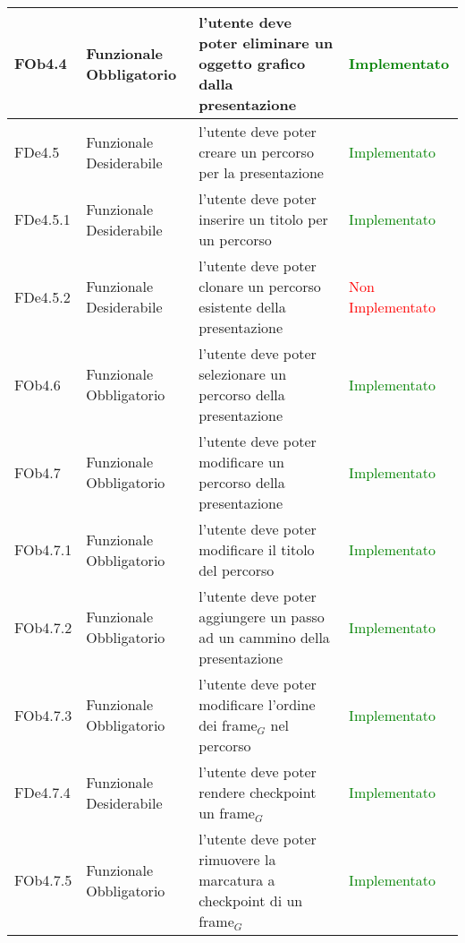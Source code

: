 \begin{longtable}{|l|p{2.5cm}|p{5cm}|p{3.5cm}|}
\hline
FOb4.4 & Funzionale \linebreak Obbligatorio & l'utente deve poter eliminare un oggetto grafico dalla presentazione & \textcolor{green}{Implementato}  \\
\hline
FDe4.5 & Funzionale \linebreak Desiderabile & l'utente deve poter creare un percorso per la presentazione & \textcolor{green}{Implementato}  \\
\hline
FDe4.5.1 & Funzionale \linebreak Desiderabile & l'utente deve poter inserire un titolo per un percorso & \textcolor{green}{Implementato}  \\
\hline
FDe4.5.2 & Funzionale \linebreak Desiderabile & l'utente deve poter clonare un percorso esistente della presentazione & \textcolor{red}{Non Implementato}  \\
\hline
FOb4.6 & Funzionale \linebreak Obbligatorio & l'utente deve poter selezionare un percorso della presentazione & \textcolor{green}{Implementato}  \\
\hline
FOb4.7 & Funzionale \linebreak Obbligatorio & l'utente deve poter modificare un percorso della presentazione & \textcolor{green}{Implementato}  \\
\hline
FOb4.7.1 & Funzionale \linebreak Obbligatorio & l'utente deve poter modificare il titolo del percorso & \textcolor{green}{Implementato}  \\
\hline
FOb4.7.2 & Funzionale \linebreak Obbligatorio & l'utente deve poter aggiungere un passo ad un cammino della presentazione & \textcolor{green}{Implementato}  \\
\hline
FOb4.7.3 & Funzionale \linebreak Obbligatorio & l'utente deve poter modificare l'ordine dei frame$_G$ nel percorso & \textcolor{green}{Implementato}  \\
\hline
FDe4.7.4 & Funzionale \linebreak Desiderabile & l'utente deve poter rendere checkpoint un frame$_G$ & \textcolor{green}{Implementato}  \\
\hline
FOb4.7.5 & Funzionale \linebreak Obbligatorio & l'utente deve poter rimuovere la marcatura a checkpoint di un frame$_G$ & \textcolor{green}{Implementato}  \\
\hline

\end{longtable}
